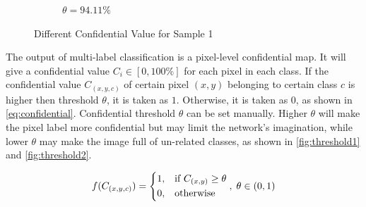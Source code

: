\begin{spacing}{1.5}
\begin{figure}[!ht]
\begin{subfigure}[b]{0.49\textwidth}
        \caption{$\theta = 94.11\%$}
    \end{subfigure}
    \caption{Different Confidential Value for Sample 1}
    \label{fig:threshold1}
\end{figure}


The output of multi-label classification is a pixel-level confidential map. It will give a confidential value $C_i \in [0,100\%]$ for each pixel in each class. If the confidential value $C_{(x,y,c)}$ of certain pixel $(x,y)$ belonging to certain class $c$ is higher then threshold $\theta$, it is taken as $1$. Otherwise, it is taken as $0$, as shown in \autoref{eq:confidential}. Confidential threshold $\theta$ can be set manually. Higher $\theta$ will make the pixel label more confidential but may limit the network's imagination, while lower $\theta$ may make the image full of un-related classes, as shown in \autoref{fig:threshold1} and \autoref{fig:threshold2}.

\begin{equation}
\label{eq:confidential}
    f(C_{(x,y,c)})= 
    \begin{dcases}
        1, & \text{if } C_{(x,y)} \geq \theta\\
        0, & \text{otherwise}
    \end{dcases},\; \theta \in (0,1) 
\end{equation}


\end{spacing}
